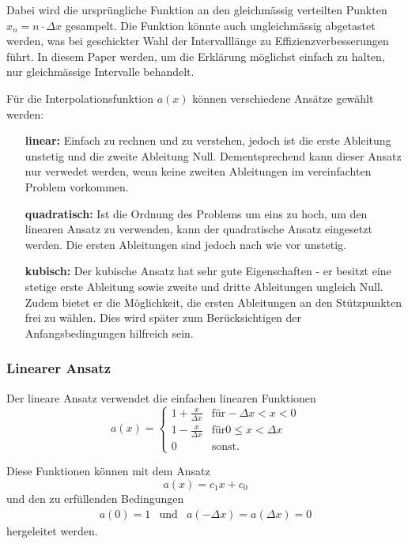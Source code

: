 Dabei wird die ursprüngliche Funktion an den gleichmässig verteilten Punkten $x_n = n \cdot \Delta x$ gesampelt. 
Die Funktion könnte auch ungleichmässig abgetastet werden, was bei geschickter Wahl der Intervalllänge zu Effizienzverbesserungen führt.
In diesem Paper werden, um die Erklärung möglichst einfach zu halten, nur gleichmässige Intervalle behandelt. 

Für die Interpolationsfunktion $a(x)$ können verschiedene Ansätze gewählt werden:
\begin{itemize}
    \item[\textbf{linear:}] 
        Einfach zu rechnen und zu verstehen, jedoch ist die erste Ableitung unstetig und die zweite Ableitung Null.
        Dementsprechend kann dieser Ansatz nur verwedet werden, wenn keine zweiten Ableitungen im vereinfachten Problem vorkommen.
    \item[\textbf{quadratisch:}]
        Ist die Ordnung des Problems um eins zu hoch, um den linearen Ansatz zu verwenden, kann der quadratische Ansatz eingesetzt werden.
        Die ersten Ableitungen sind jedoch nach wie vor unstetig.
    \item[\textbf{kubisch:}]  
        Der kubische Ansatz hat sehr gute Eigenschaften - er besitzt eine stetige erste Ableitung sowie zweite und dritte Ableitungen ungleich Null. 
        Zudem bietet er die Möglichkeit, die ersten Ableitungen an den Stützpunkten frei zu wählen.
        Dies wird später zum Berücksichtigen der Anfangsbedingungen hilfreich sein.
\end{itemize}

\subsubsection{Linearer Ansatz}
Der lineare Ansatz verwendet die einfachen linearen Funktionen
\begin{equation}
    a(x) = \left\{ \begin{array}{ll}
        1+\frac{x}{\Delta x} & \mbox{für} -\Delta x < x < 0 \\
        1-\frac{x}{\Delta x} & \mbox{für} 0 \leq x < \Delta x \\
        0                    & \mbox{sonst}.
    \end{array} \right.
\end{equation}

Diese Funktionen können mit dem Ansatz 
\begin{equation}
    a(x) = c_1x + c_0 %
\end{equation}
und den zu erfüllenden Bedingungen
\begin{equation}
    \begin{array}{ccc}
        a(0) = 1 & \mbox{und} & a(-\Delta x) = a(\Delta x) = 0
    \end{array}
\end{equation}
hergeleitet werden.

